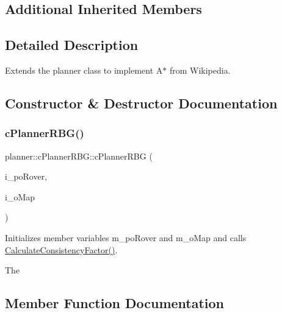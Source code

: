\subsection*{Additional Inherited Members}


\subsection{Detailed Description}
Extends the planner class to implement A$\ast$ from Wikipedia. 

\subsection{Constructor \& Destructor Documentation}
\mbox{\label{classplanner_1_1c_planner_r_b_g_a91296b98e64effc16f38e2430746d94d}} 
\subsubsection{\texorpdfstring{c\+Planner\+R\+B\+G()}{cPlannerRBG()}}
{\footnotesize\ttfamily planner\+::c\+Planner\+R\+B\+G\+::c\+Planner\+R\+BG (\begin{DoxyParamCaption}\item[{std\+::shared\+\_\+ptr$<$ \mbox{\hyperlink{classplanner_1_1c_rover_interface}{c\+Rover\+Interface}}$<$ 8 $>$$>$}]{i\+\_\+po\+Rover,  }\item[{std\+::shared\+\_\+ptr$<$ \mbox{\hyperlink{classplanner_1_1c_graph}{c\+Graph}} $>$}]{i\+\_\+o\+Map }\end{DoxyParamCaption})}



Initializes member variables m\+\_\+po\+Rover and m\+\_\+o\+Map and calls \mbox{\hyperlink{classplanner_1_1c_planner_a2e5a745f83f903662eff914d8beddb5e}{Calculate\+Consistency\+Factor()}}. 

The 

\subsection{Member Function Documentation}
\mbox{\label{classplanner_1_1c_planner_r_b_g_a0bbd752702da582a47dbd153c0065eb5}} 
